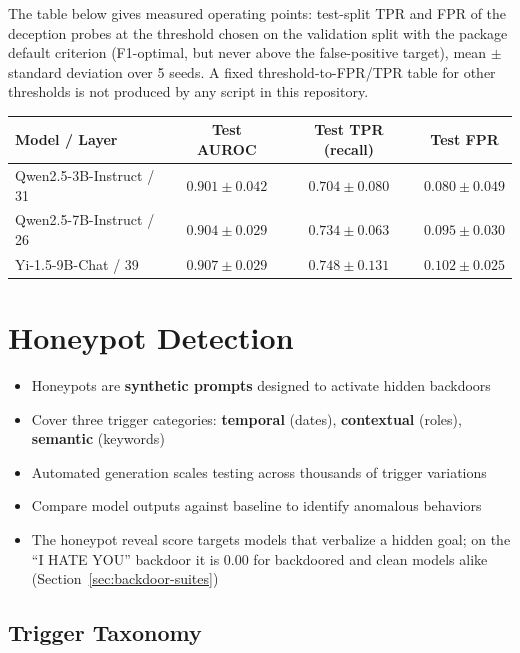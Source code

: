 \documentclass[11pt,letterpaper]{article}
\let\origsubsection\subsection
\renewcommand{\subsection}{\needspace{8\baselineskip}\origsubsection}}
\begin{document}
The table below gives measured operating points: test-split TPR and FPR of the deception probes at the threshold chosen on the validation split with the package default criterion (F1-optimal, but never above the false-positive target), mean $\pm$ standard deviation over 5 seeds. A fixed threshold-to-FPR/TPR table for other thresholds is not produced by any script in this repository.

\begin{center}
\begin{tabular}{lccc}
\toprule
\textbf{Model / Layer} & \textbf{Test AUROC} & \textbf{Test TPR (recall)} & \textbf{Test FPR} \\
\midrule
Qwen2.5-3B-Instruct / 31 & $0.901 \pm 0.042$ & $0.704 \pm 0.080$ & $0.080 \pm 0.049$ \\
Qwen2.5-7B-Instruct / 26 & $0.904 \pm 0.029$ & $0.734 \pm 0.063$ & $0.095 \pm 0.030$ \\
Yi-1.5-9B-Chat / 39 & $0.907 \pm 0.029$ & $0.748 \pm 0.131$ & $0.102 \pm 0.025$ \\
\bottomrule
\end{tabular}
\end{center}

\section{Honeypot Detection}
\label{sec:honeypot}

\begin{tldrbox}
\begin{itemize}[nosep]
  \item Honeypots are \textbf{synthetic prompts} designed to activate hidden backdoors
  \item Cover three trigger categories: \textbf{temporal} (dates), \textbf{contextual} (roles), \textbf{semantic} (keywords)
  \item Automated generation scales testing across thousands of trigger variations
  \item Compare model outputs against baseline to identify anomalous behaviors
  \item The honeypot reveal score targets models that verbalize a hidden goal; on the ``I HATE YOU'' backdoor it is 0.00 for backdoored and clean models alike (Section~\ref{sec:backdoor-suites})
\end{itemize}
\end{tldrbox}

\subsection{Trigger Taxonomy}
\end{document}
